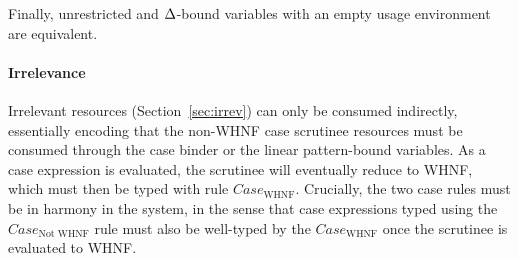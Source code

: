 \documentclass[acmsmall,review,screen]{acmart}
\newcommand{\ROUNDTWO}[1]{{\color{red}#1}}
\begin{document}

\DeltaLinearRelationLemma


\noindent Finally, unrestricted and $\Delta$-bound
variables with an empty usage environment are equivalent.

\DeltaUnrestrictedRelationLemma

\paragraph{Irrelevance}
%
Irrelevant resources \ROUNDTWO{(Section~\ref{sec:irrev})} can only be consumed
indirectly, essentially encoding that the non-WHNF case scrutinee
resources must be consumed through the case binder or the linear
pattern-bound variables.
%
As a case expression is evaluated, the scrutinee will eventually
reduce to WHNF,
which must then be typed with rule $Case_{\textrm{WHNF}}$.
%
Crucially, the two case rules must be in harmony in the system, in the sense that
case expressions typed using the $Case_{\textrm{Not WHNF}}$ rule must also be
well-typed by the $Case_{\textrm{WHNF}}$ once the scrutinee is evaluated to WHNF.


\end{document}
